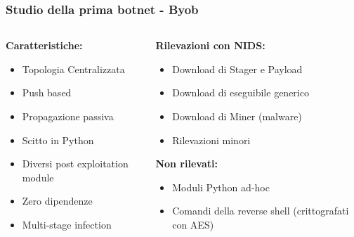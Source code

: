 \begin{frame}
    \frametitle{Studio della prima botnet - Byob}
    \begin{columns}[t]
        \begin{column}{0.48\textwidth}
            \textbf{Caratteristiche:}
            \begin{itemize}
                \item Topologia Centralizzata
                \item Push based
                \item Propagazione passiva
                \item Scitto in Python
                \item Diversi post exploitation module
                \item Zero dipendenze
                \item Multi-stage infection
            \end{itemize}
        \end{column}
        \begin{column}{0.48\textwidth}
            \textbf{Rilevazioni con NIDS:}
            \begin{itemize}
                \item Download di Stager e Payload
                \item Download di eseguibile generico
                \item Download di Miner (malware)
                \item Rilevazioni minori
            \end{itemize}
            \textbf{Non rilevati:}
            \begin{itemize}
                \item Moduli Python ad-hoc
                \item Comandi della reverse shell (crittografati con AES)
            \end{itemize}
        \end{column}
    \end{columns}
\end{frame}


